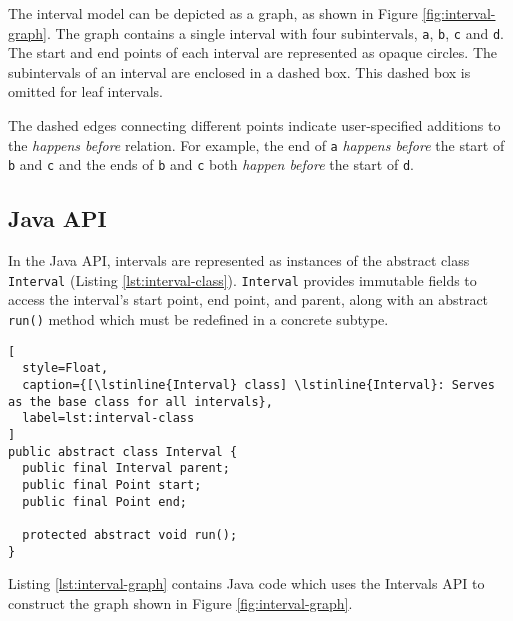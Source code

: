 The interval model can be depicted as a graph, as shown in Figure
\ref{fig:interval-graph}. The graph contains a single interval with
four subintervals, \lstinline|a|, \lstinline|b|, \lstinline|c| and
\lstinline|d|. The start and end points of each interval are
represented as opaque circles. The subintervals of an interval are
enclosed in a dashed box. This dashed box is omitted for leaf
intervals.

The dashed edges connecting different points indicate user-specified
additions to the \emph{happens before} relation. For example, the end
of \lstinline|a| \emph{happens before} the start of \lstinline|b| and
\lstinline|c| and the ends of \lstinline|b| and \lstinline|c| both
\emph{happen before} the start of \lstinline|d|.

\subsection{Java API}
\label{sec:intro-intervals-java-api}

In the Java API, intervals are represented as instances of the
abstract class \lstinline|Interval| (Listing
\ref{lst:interval-class}). \lstinline|Interval| provides immutable
fields to access the interval's start point, end point, and parent,
along with an abstract \lstinline|run()| method which must be
redefined in a concrete subtype.

\begin{lstlisting}[
  style=Float, 
  caption={[\lstinline{Interval} class] \lstinline{Interval}: Serves as the base class for all intervals},
  label=lst:interval-class
]
public abstract class Interval {
  public final Interval parent;
  public final Point start;
  public final Point end;

  protected abstract void run();
}
\end{lstlisting}

Listing \ref{lst:interval-graph} contains Java code which uses the
Intervals API to construct the graph shown in Figure
\ref{fig:interval-graph}.

